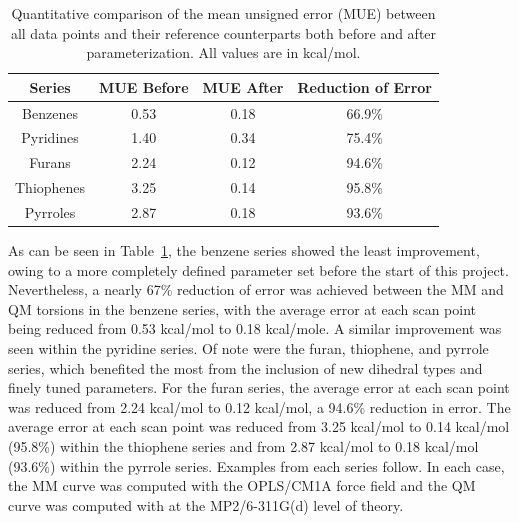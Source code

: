 \documentclass[12pt]{report}
\def\tablab{Table}\def\tabslab{\tablab s}
\newcommand*\tbl[1]{\tablab~\ref{#1}}
\begin{document}
\begin{table}[ht]
\centering
\caption{Quantitative comparison of the mean unsigned error (MUE) between all data points and their reference counterparts both before and after parameterization. All values are in kcal/mol.}
\begin{tabular}{cccc}
\toprule
Series & MUE Before & MUE After & Reduction of Error \\
\midrule
Benzenes        & 0.53        & 0.18        & 66.9\%\\
Pyridines       & 1.40        & 0.34        & 75.4\%\\
Furans          & 2.24        & 0.12        & 94.6\%\\
Thiophenes      & 3.25        & 0.14        & 95.8\%\\
Pyrroles        & 2.87        & 0.18        & 93.6\%\\
\bottomrule
\end{tabular}
\label{dihred}
\end{table}

As can be seen in \tbl{dihred}, the benzene series showed the least improvement, owing to a more completely defined parameter set before the start of this project. Nevertheless, a nearly 67\% reduction of error was achieved between the MM and QM torsions in the benzene series, with the average error at each scan point being reduced from 0.53 kcal/mol to 0.18 kcal/mole. A similar improvement was seen within the pyridine series. Of note were the furan, thiophene, and pyrrole series, which benefited the most from the inclusion of new dihedral types and finely tuned parameters. For the furan series, the average error at each scan point was reduced from 2.24 kcal/mol to 0.12 kcal/mol, a 94.6\% reduction in error. The average error at each scan point was reduced from 3.25 kcal/mol to 0.14 kcal/mol (95.8\%) within the thiophene series and from 2.87 kcal/mol to 0.18 kcal/mol (93.6\%) within the pyrrole series. Examples from each series follow. In each case, the MM curve was computed with the OPLS/CM1A force field and the QM curve was computed with at the MP2/6-311G(d) level of theory.
\end{document}
